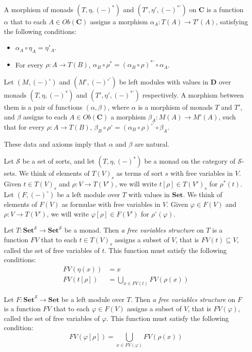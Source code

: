\documentclass{elsarticle}
\theoremstyle{definition}
\theoremstyle{remark}
\newcommand{\cat}[1]{\mathbf{#1}}
\newcommand{\C}{\cat{C}}
\newcommand{\D}{\cat{D}}
\newcommand{\Set}{\cat{Set}}
\numberwithin{figure}{section}
\begin{document}
\begin{defn}
A morphism of monads $(T,\eta,(-)^*)$ and $(T',\eta',(-)^{*'})$ on $\C$ is a function $\alpha$ that to each $A \in Ob(\C)$ assigns a morphism $\alpha_A : T(A) \to T'(A)$,
satisfying the following conditions:
\begin{itemize}
\item $\alpha_A \circ \eta_A = \eta'_A$.
\item For every $\rho : A \to T(B)$, $\alpha_B \circ \rho^* = (\alpha_B \circ \rho)^{*'} \circ \alpha_A$.
\end{itemize}

Let $(M,(-)^\circ)$ and $(M',(-)^{\circ'})$ be left modules with values in $\D$ over monads $(T,\eta,(-)^*)$ and $(T',\eta',(-)^{*'})$ respectively.
A morphism between them is a pair of functions $(\alpha,\beta)$, where $\alpha$ is a morphism of monads $T$ and $T'$,
and $\beta$ assigns to each $A \in Ob(\C)$ a morphism $\beta_A : M(A) \to M'(A)$,
such that for every $\rho : A \to T(B)$, $\beta_B \circ \rho^\circ = (\alpha_B \circ \rho)^{\circ'} \circ \beta_A$.
\end{defn}
These data and axioms imply that $\alpha$ and $\beta$ are natural.

Let $\mathcal{S}$ be a set of sorts, and let $(T,\eta,(-)^*)$ be a monad on the category of $\mathcal{S}$-sets.
We think of elements of $T(V)_s$ as terms of sort $s$ with free variables in $V$.
Given $t \in T(V)_s$ and $\rho : V \to T(V')$, we will write $t[\rho] \in T(V')_s$ for $\rho^*(t)$.
Let $(F,(-)^\circ)$ be a left module over $T$ with values in $\Set$.
We think of elements of $F(V)$ as formulae with free variables in $V$.
Given $\varphi \in F(V)$ and $\rho : V \to T(V')$, we will write $\varphi[\rho] \in F(V')$ for $\rho^\circ(\varphi)$.

Let $T : \Set^\mathcal{S} \to \Set^\mathcal{S}$ be a monad.
Then \emph{a free variables structure} on $T$ is a function $FV$ that to each $t \in T(V)_s$ assigns a subset of $V$, that is $FV(t) \subseteq V$, called the set of free variables of $t$.
This function must satisfy the following conditions:
\begin{align*}
FV(\eta(x)) & = x \\
FV(t[\rho]) & = \bigcup_{x \in FV(t)} FV(\rho(x))
\end{align*}

Let $F : \Set^\mathcal{S} \to \Set$ be a left module over $T$.
Then \emph{a free variables structure} on $F$ is a function $FV$ that to each $\varphi \in F(V)$ assigns a subset of $V$, that is $FV(\varphi)$, called the set of free variables of $\varphi$.
This function must satisfy the following condition:
\[ FV(\varphi[\rho]) = \bigcup_{x \in FV(\varphi)} FV(\rho(x)) \]
\end{document}
